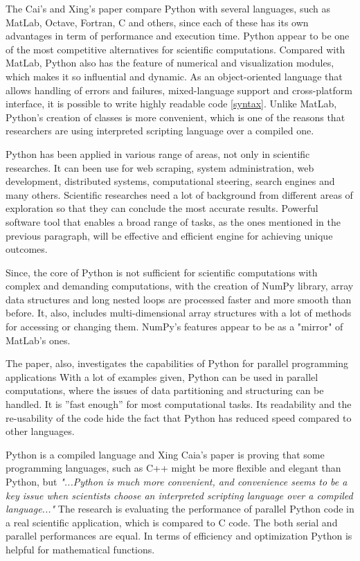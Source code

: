 The Cai's and Xing's paper \cite{cai2005performance} compare Python with several languages, such as MatLab, Octave, Fortran, C and others, since each of these has its own advantages in term of performance and execution time. Python appear to be one of the most competitive alternatives for scientific computations. Compared with MatLab, Python also has the feature of numerical and visualization modules, which makes it so influential and dynamic. As an object-oriented language that allows handling of errors and failures, mixed-language support and cross-platform interface, it is possible to write highly readable code \ref{syntax}. Unlike MatLab, Python's creation of classes is more convenient, which is one of the reasons that researchers are using interpreted scripting language over a compiled one.

Python has been applied in various range of areas, not only in scientific researches. It can been use for web scraping, system administration, web development, distributed systems, computational steering, search engines and many others. \cite{cai2005performance} Scientific researches need a lot of background from different areas of exploration so that they can conclude the most accurate results. Powerful software tool that enables a broad range of tasks, as the ones mentioned in the previous paragraph, will be effective and efficient engine for achieving unique outcomes. 

Since, the core of Python is not sufficient for scientific computations with complex and demanding computations, with the creation of NumPy library, array data structures and long nested loops are processed faster and more smooth than before. It, also, includes multi-dimensional array structures with a lot of methods for accessing or changing them. NumPy's features appear to be as a "mirror" of MatLab's ones. 

The paper, also, investigates the capabilities of Python for parallel programming applications \cite{cai2005performance} With a lot of examples given, Python can be used in parallel computations, where the issues of data partitioning and structuring can be handled. It is ”fast enough” for most computational tasks. Its readability and the re-usability of the code hide the fact that Python has reduced speed compared to other languages. 

Python is a compiled language and Xing Caia's paper \cite{cai2005performance} 
is proving that some programming languages, such as C++ might be more flexible and elegant than Python, but \textit{"...Python is much more convenient, and convenience seems to be a key issue when scientists choose an interpreted scripting language over a compiled language..."} \cite{cai2005performance} The research is evaluating the performance of parallel Python code in a real scientific application, which is compared to C code. The both serial and parallel performances are equal. In terms of efficiency and optimization Python is helpful for mathematical functions.

